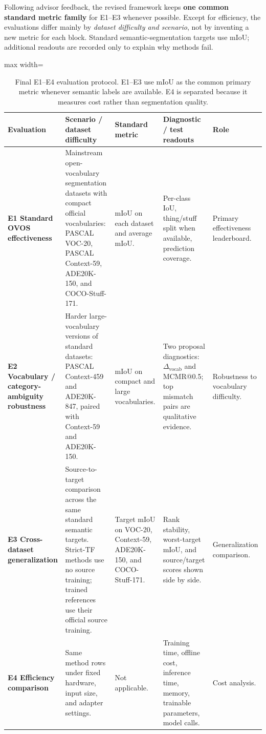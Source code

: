 \documentclass[11pt,a4paper]{article}
\begin{document}
Following advisor feedback, the revised framework keeps \textbf{one common standard metric family} for E1--E3 whenever possible. Except for efficiency, the evaluations differ mainly by \emph{dataset difficulty and scenario}, not by inventing a new metric for each block. Standard semantic-segmentation targets use mIoU; additional readouts are recorded only to explain why methods fail.

\begin{table}[!htbp]
\centering
\small
\caption{Final E1--E4 evaluation protocol. E1--E3 use mIoU as the common primary metric whenever semantic labels are available. E4 is separated because it measures cost rather than segmentation quality.}
\label{tab:evaluation-overview}
\setlength{\tabcolsep}{3pt}
\begin{adjustbox}{max width=\textwidth}
\begin{tabular}{p{} p{} p{} p{} p{}}
\toprule
Evaluation & Scenario / dataset difficulty & Standard metric & Diagnostic / test readouts & Role \\
\midrule
\textbf{E1 Standard OVOS effectiveness} &
Mainstream open-vocabulary segmentation datasets with compact official vocabularies: PASCAL VOC-20, PASCAL Context-59, ADE20K-150, and COCO-Stuff-171. &
mIoU on each dataset and average mIoU. &
Per-class IoU, thing/stuff split when available, prediction coverage. &
Primary effectiveness leaderboard. \\
\addlinespace[2pt]
\textbf{E2 Vocabulary / category-ambiguity robustness} &
Harder large-vocabulary versions of standard datasets: PASCAL Context-459 and ADE20K-847, paired with Context-59 and ADE20K-150. &
mIoU on compact and large vocabularies. &
Two proposal diagnostics: $\Delta_{\mathrm{vocab}}$ and MCMR@0.5; top mismatch pairs are qualitative evidence. &
Robustness to vocabulary difficulty. \\
\addlinespace[2pt]
\textbf{E3 Cross-dataset generalization} &
Source-to-target comparison across the same standard semantic targets. Strict-TF methods use no source training; trained references use their official source training. &
Target mIoU on VOC-20, Context-59, ADE20K-150, and COCO-Stuff-171. &
Rank stability, worst-target mIoU, and source/target scores shown side by side. &
Generalization comparison. \\
\addlinespace[2pt]
\textbf{E4 Efficiency comparison} &
Same method rows under fixed hardware, input size, and adapter settings. &
Not applicable. &
Training time, offline cost, inference time, memory, trainable parameters, model calls. &
Cost analysis. \\
\bottomrule
\end{tabular}
\end{adjustbox}
\end{table}
\end{document}
